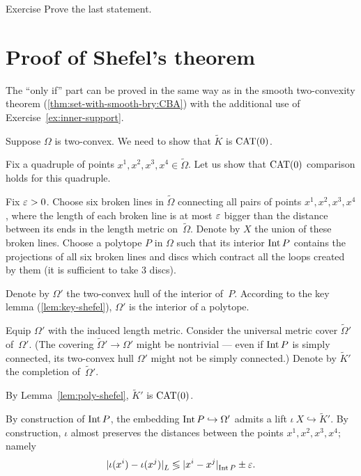 \begin{thm}{Exercise}\label{ex:convex+saddle+broken=>PL}
Prove the last statement.\qeds
\end{thm}

\section{Proof of Shefel's theorem}

The ``only if'' part can be proved in the same way as in the smooth two-convexity theorem (\ref{thm:set-with-smooth-bry:CBA}) with the additional use of Exercise~\ref{ex:inner-support}.

Suppose $\Omega$ is two-convex. 
We need to show that $\tilde K$ is $\mathrm{CAT}(0)$.

Fix a quadruple of points $x^1,x^2,x^3,x^4\in\tilde \Omega$.
Let us show that
$\mathrm{CAT}(0)$ comparison holds for this quadruple.

Fix $\varepsilon>0$.
Choose six broken lines in $\tilde \Omega$ connecting all pairs of points $x^1,x^2,x^3,x^4$, where the length of each  broken line is at most $\varepsilon$ bigger than 
the distance between its ends in the length metric on~$\tilde \Omega$.
Denote by $X$ the union of these broken lines.
Choose a polytope $P$ in $\Omega$ such that its interior $\operatorname{\rm Int}\nolimits P$ contains the projections of all six broken lines and discs which contract all the loops created by them (it is sufficient to take 3 discs).

Denote by $\Omega'$ the two-convex hull of the interior of~$P$.
According to the key lemma (\ref{lem:key-shefel}), $\Omega'$ is the interior of a polytope.

Equip $\Omega'$ with the induced length metric.
Consider the universal metric cover $\tilde\Omega'$ of~$\Omega'$.
(The covering $\tilde\Omega'\to\Omega'$ might be nontrivial ---
even if $\operatorname{\rm Int}\nolimits P$ is simply connected, its two-convex hull $\Omega'$ might not be simply connected.)
Denote by $\tilde K'$ the completion of~$\tilde\Omega'$.

By Lemma~\ref{lem:poly-shefel}, $\tilde K'$ is $\mathrm{CAT}(0)$.

By construction of $\operatorname{\rm Int}\nolimits P$, the embedding $\operatorname{\rm Int}\nolimits P\hookrightarrow \Omega'$
admits a lift $\iota\:X\hookrightarrow \tilde K'$.
By construction, $\iota$ almost preserves the distances between the points $x^1,x^2,x^3,x^4$;
namely 
\begin{align*}
\dist{\iota(x^i)}{\iota(x^j)}{L}\lessgtr \dist{x^i}{x^j}{\Int P}\pm\eps.
\end{align*}

